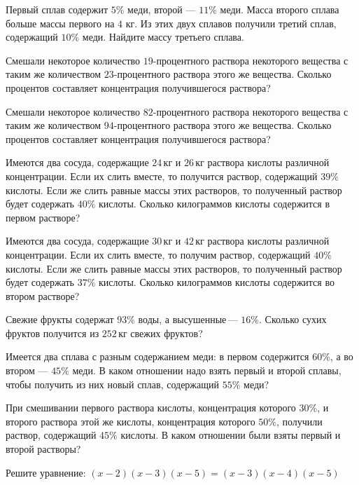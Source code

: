 %
%

\begin{class}[number=1]
	\begin{listofex}
		\item Первый сплав содержит \( 5\% \) меди, второй --- \( 11\% \) меди. Масса второго сплава больше массы первого на \( 4 \) кг. Из этих двух сплавов получили третий сплав, содержащий \( 10\% \) меди. Найдите массу третьего сплава.
		\item Смешали некоторое количество \( 19 \)-процентного раствора некоторого вещества с таким же количеством \( 23 \)-процентного раствора этого же вещества. Сколько процентов составляет концентрация получившегося раствора?
		\item Смешали некоторое количество \( 82 \)-процентного раствора некоторого вещества с таким же количеством \( 94 \)-процентного раствора этого же вещества. Сколько процентов составляет концентрация получившегося раствора?
		\item Имеются два сосуда, содержащие \( 24 \) кг и \( 26 \) кг раствора кислоты различной концентрации. Если их слить вместе, то получится раствор, содержащий \( 39\% \) кислоты. Если же слить равные массы этих растворов, то полученный раствор будет содержать \( 40\% \) кислоты. Сколько килограммов кислоты содержится в первом растворе?
		\item Имеются два сосуда, содержащие \( 30 \) кг и \( 42 \) кг раствора кислоты различной концентрации. Если их слить вместе, то получим раствор, содержащий \( 40\% \) кислоты. Если же слить равные массы этих растворов, то полученный раствор будет содержать \( 37\% \) кислоты. Сколько килограммов кислоты содержится во втором растворе?
		\item Свежие фрукты содержат \( 93\% \) воды, а высушенные --- \( 16\% \). Сколько сухих фруктов получится из \( 252 \) кг свежих фруктов?
		\item Имеется два сплава с разным содержанием меди: в первом содержится \( 60\% \), а во втором --- \( 45\% \) меди. В каком отношении надо взять первый и второй сплавы, чтобы получить из них новый сплав, содержащий \( 55\% \) меди?
		\item При смешивании первого раствора кислоты, концентрация которого \( 30\% \), и второго раствора этой же кислоты, концентрация которого \( 50\% \), получили раствор, содержащий \( 45\% \) кислоты. В каком отношении были взяты первый и второй растворы?
		\item Решите уравнение: \((x-2)(x-3)(x-5)=(x-3)(x-4)(x-5)\)
	\end{listofex}
\end{class}

